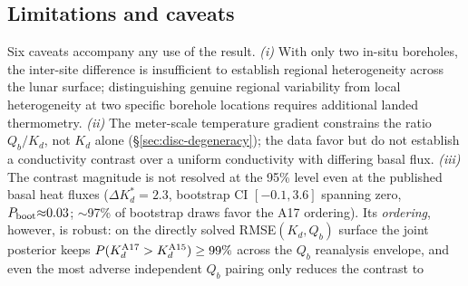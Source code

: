 \documentclass[11pt]{article}
\begin{document}
\subsection{Limitations and caveats}\label{sec:limitations}
Six caveats accompany any use of the result. \emph{(i)} With only two
in-situ boreholes, the inter-site difference is insufficient to establish
regional heterogeneity across the lunar surface; distinguishing genuine
regional variability from local heterogeneity at two specific borehole
locations requires additional landed thermometry. \emph{(ii)} The
meter-scale temperature gradient constrains the ratio
$Q_b/K_d$, not $K_d$ alone (\S\ref{sec:disc-degeneracy}); the data favor
but do not establish a conductivity contrast over a uniform conductivity
with differing basal flux. \emph{(iii)} The contrast magnitude
is not resolved at the 95\% level even at the published
basal heat fluxes ($\Delta K_d^{*}=2.3$, bootstrap CI $[-0.1,3.6]$
spanning zero, $P_{\rm boot}{\approx}0.03$; $\sim$97\% of bootstrap draws favor the
A17 ordering). Its \emph{ordering}, however, is robust: on the directly
solved RMSE$(K_d,Q_b)$ surface the joint posterior keeps
$P(K_d^{\rm A17}>K_d^{\rm A15})\ge 99\%$ across the
\citet{saito2007,nagihara2018} $Q_b$ reanalysis envelope, and even the
most adverse independent $Q_b$ pairing only reduces the contrast to
\end{document}
